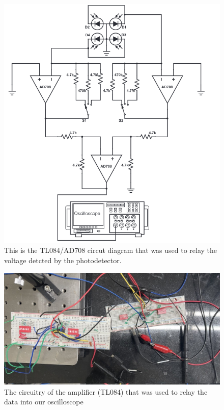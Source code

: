 \begin{figure}[H]
	\centering
	\includegraphics[scale=0.7]{screenshot001}
	\caption{This is the TL084/AD708 circut diagram that was used to relay the voltage detcted by the photodetector.}
	\label{fig:screenshot001}
\end{figure}
\begin{figure}[H]
	\centering
	\includegraphics[scale=0.3]{breadboard.jpeg}
	\caption{The circuitry of the amplifier (TL084) that was used to relay the data into our oscilloscope}
	\label{fig:mb-fe-0}
\end{figure}


